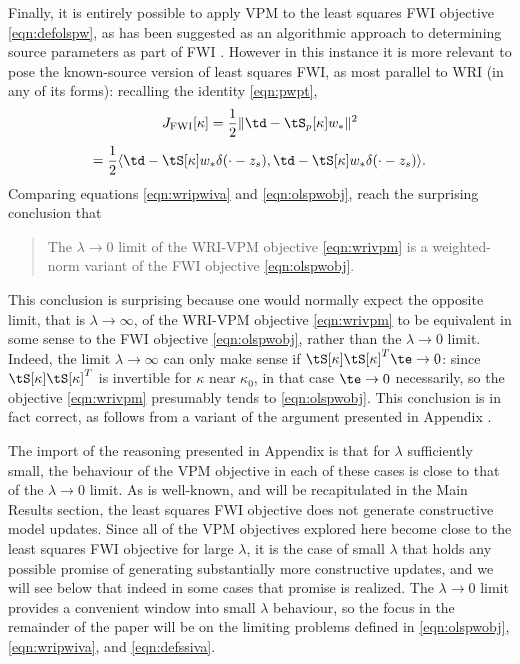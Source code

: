 Finally, it is entirely possible to apply VPM to the least squares FWI
objective \ref{eqn:defolspw}, as has been suggested as an algorithmic
approach to determining source parameters as part of FWI
\cite{Rickett:SEG12,LiRickettAbubakar:13}. However in this instance it
is more relevant to pose the known-source version of least squares
FWI, as most parallel to WRI (in any of its forms): recalling the
identity \ref{eqn:pwpt}, 
\[
  J_{\rm FWI}[\kappa] = \frac{1}{2}\|\td-\tS_p[\kappa]w_*\|^2
\]
\begin{equation}
  \label{eqn:olspwobj}
  = \frac{1}{2}\langle \td -
  \tS[\kappa]w_*\delta(\cdot-z_s), \td -
  \tS[\kappa]w_*\delta(\cdot-z_s)\rangle.
\end{equation}
Comparing equations \ref{eqn:wripwiva} and \ref{eqn:olspwobj}, reach
the surprising conclusion that
\begin{quote}
  The $\lambda \rightarrow 0$ limit of the WRI-VPM objective
  \ref{eqn:wrivpm} is a weighted-norm variant of the FWI objective
  \ref{eqn:olspwobj}.
\end{quote}
This conclusion is surprising because one would normally expect the
opposite limit, that is $\lambda \rightarrow \infty$, of the WRI-VPM
objective \ref{eqn:wrivpm} to be equivalent in some sense to the FWI
objective \ref{eqn:olspwobj}, rather than the $\lambda \rightarrow 0$
limit. Indeed, the limit $\lambda \rightarrow \infty$ can only make
sense if $\tS[\kappa]\tS[\kappa]^T\te \rightarrow 0$: since
$\tS[\kappa]\tS[\kappa]^T$ is invertible for $\kappa$ near $\kappa_0$,
in that case $\te \rightarrow 0$ necessarily, so the objective
\ref{eqn:wrivpm} presumably tends to \ref{eqn:olspwobj}. This conclusion
is in fact correct, as follows from a variant of the argument
presented in Appendix \appIVA.

The import of the reasoning presented in Appendix \appIVA is that for
$\lambda$ sufficiently small, the behaviour of the VPM objective in
each of these cases is close to that of the $\lambda \rightarrow 0$
limit. As is well-known, and will be recapitulated in the Main Results
section, the least squares FWI objective does not generate
constructive model updates. Since all of the VPM objectives explored
here become close to the least squares FWI objective for large
$\lambda$, it is the case of small $\lambda$ that holds any possible
promise of generating substantially more constructive updates, and we
will see below that indeed in some cases that promise is realized. The
$\lambda \rightarrow 0$ limit provides a convenient window into
small $\lambda$ behaviour, so the focus in the remainder of the paper
will be on the limiting problems defined in \ref{eqn:olspwobj},
\ref{eqn:wripwiva}, and \ref{eqn:defssiva}.
